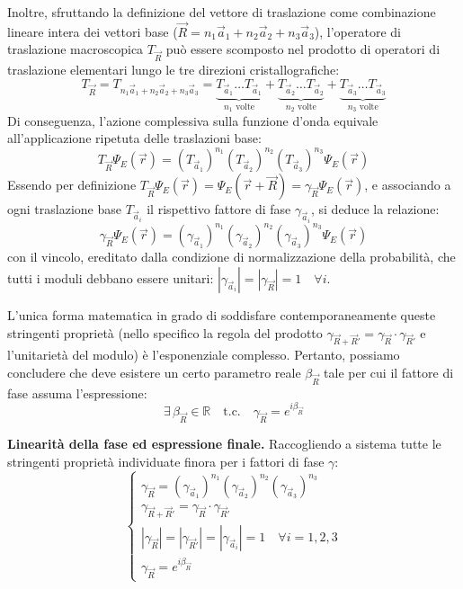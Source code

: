 Inoltre, sfruttando la definizione del vettore di traslazione come combinazione lineare intera dei vettori base (\(\vec{R} = n_1\vec{a}_1 + n_2\vec{a}_2 + n_3\vec{a}_3\)), l'operatore di traslazione macroscopica \(T_{\vec{R}}\) può essere scomposto nel prodotto di operatori di traslazione elementari lungo le tre direzioni cristallografiche:
\begin{equation}
    T_{\vec{R}} = T_{n_1\vec{a}_1 + n_2\vec{a}_2 + n_3\vec{a}_3} = \underbrace{T_{\vec{a}_1} \dots T_{\vec{a}_1}}_{n_1 \text{ volte}} + \underbrace{T_{\vec{a}_2} \dots T_{\vec{a}_2}}_{n_2 \text{ volte}} + \underbrace{T_{\vec{a}_3} \dots T_{\vec{a}_3}}_{n_3 \text{ volte}}
\end{equation}
Di conseguenza, l'azione complessiva sulla funzione d'onda equivale all'applicazione ripetuta delle traslazioni base:
\begin{equation}
    T_{\vec{R}} \Psi_E(\vec{r}) = (T_{\vec{a}_1})^{n_1} (T_{\vec{a}_2})^{n_2} (T_{\vec{a}_3})^{n_3} \Psi_E(\vec{r})
\end{equation}
Essendo per definizione \(T_{\vec{R}} \Psi_E(\vec{r}) = \Psi_E(\vec{r} + \vec{R}) = \gamma_{\vec{R}} \Psi_E(\vec{r})\), e associando a ogni traslazione base \(T_{\vec{a}_i}\) il rispettivo fattore di fase \(\gamma_{\vec{a}_i}\), si deduce la relazione:
\begin{equation}
    \gamma_{\vec{R}} \Psi_E(\vec{r}) = (\gamma_{\vec{a}_1})^{n_1} (\gamma_{\vec{a}_2})^{n_2} (\gamma_{\vec{a}_3})^{n_3} \Psi_E(\vec{r})
\end{equation}
con il vincolo, ereditato dalla condizione di normalizzazione della probabilità, che tutti i moduli debbano essere unitari: \(|\gamma_{\vec{a}_i}| = |\gamma_{\vec{R}}| = 1 \quad \forall i\).

L'unica forma matematica in grado di soddisfare contemporaneamente queste stringenti proprietà (nello specifico la regola del prodotto \(\gamma_{\vec{R}+\vec{R}'} = \gamma_{\vec{R}} \cdot \gamma_{\vec{R}'}\) e l'unitarietà del modulo) è l'esponenziale complesso. Pertanto, possiamo concludere che deve esistere un certo parametro reale \(\beta_{\vec{R}}\) tale per cui il fattore di fase assuma l'espressione:
\begin{equation}
    \exists \, \beta_{\vec{R}} \in \mathbb{R} \quad \text{t.c.} \quad \gamma_{\vec{R}} = e^{i\beta_{\vec{R}}}
\end{equation}

\textbf{Linearità della fase ed espressione finale.} Raccogliendo a sistema tutte le stringenti proprietà individuate finora per i fattori di fase \(\gamma\):
\begin{equation}
\begin{cases}
    \gamma_{\vec{R}} = (\gamma_{\vec{a}_1})^{n_1} (\gamma_{\vec{a}_2})^{n_2} (\gamma_{\vec{a}_3})^{n_3} \\
    \gamma_{\vec{R}+\vec{R}'} = \gamma_{\vec{R}} \cdot \gamma_{\vec{R}'} \\
    |\gamma_{\vec{R}}| = |\gamma_{\vec{R}'}| = |\gamma_{\vec{a}_i}| = 1 \quad \forall i=1,2,3 \\
    \gamma_{\vec{R}} = e^{i\beta_{\vec{R}}}
\end{cases}
\end{equation}

